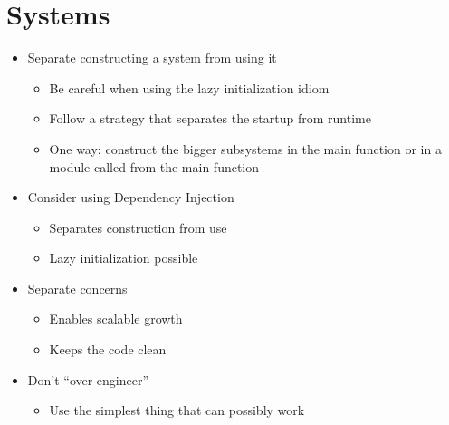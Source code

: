 \section{Systems}
\begin{itemize}
    \item Separate constructing a system from using it
    \begin{itemize}
        \item Be careful when using the lazy initialization idiom
        \item Follow a strategy that separates the startup from runtime
        \item One way: construct the bigger subsystems in the main function or in a module called from the main function
    \end{itemize}
    \item Consider using Dependency Injection
    \begin{itemize}
        \item Separates construction from use
        \item Lazy initialization possible
    \end{itemize}
    \item Separate concerns
    \begin{itemize}
        \item Enables scalable growth
        \item Keeps the code clean
    \end{itemize}
    \item Don't ``over-engineer''
    \begin{itemize}
        \item Use the simplest thing that can possibly work
    \end{itemize}
\end{itemize}
